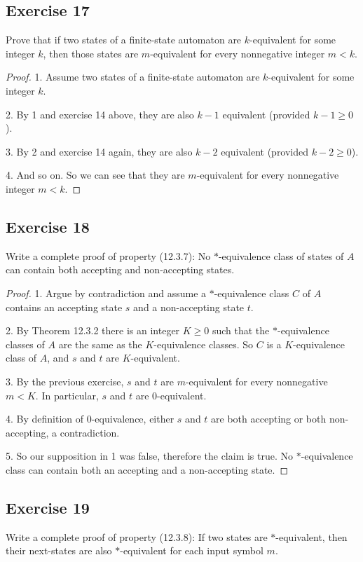 \documentclass[14pt]{extarticle}
\begin{document}
\subsection{Exercise 17}
Prove that if two states of a finite-state automaton are \(k\)-equivalent for some integer \(k\), then those states are
\(m\)-equivalent for every nonnegative integer \(m < k\).

\begin{proof}
    1. Assume two states of a finite-state automaton are \(k\)-equivalent for some integer \(k\).

    2. By 1 and exercise 14 above, they are also \(k-1\) equivalent (provided \(k-1 \geq 0\)).

    3. By 2 and exercise 14 again, they are also \(k-2\) equivalent (provided \(k-2 \geq 0\)).

    4. And so on. So we can see that they are \(m\)-equivalent for every nonnegative integer \(m < k\).
\end{proof}

\subsection{Exercise 18}
Write a complete proof of property (12.3.7): No \(*\)-equivalence class of states of \(A\) can contain both
accepting and non-accepting states.

\begin{proof}
    1. Argue by contradiction and assume a \(*\)-equivalence class \(C\) of \(A\) contains an accepting state \(s\) and a
    non-accepting state \(t\).

    2. By Theorem 12.3.2 there is an integer \(K \geq 0\) such that the \(*\)-equivalence classes of \(A\) are the same as
    the \(K\)-equivalence classes. So \(C\) is a \(K\)-equivalence class of \(A\), and \(s\) and \(t\) are \(K\)-equivalent.

    3. By the previous exercise, \(s\) and \(t\) are \(m\)-equivalent for every nonnegative \(m < K\). In particular,
    \(s\) and \(t\) are 0-equivalent.

    4. By definition of 0-equivalence, either \(s\) and \(t\) are both accepting or both non-accepting, a contradiction.

    5. So our supposition in 1 was false, therefore the claim is true. No \(*\)-equivalence class can contain both an accepting
    and a non-accepting state.
\end{proof}

\subsection{Exercise 19}
Write a complete proof of property (12.3.8): If two states are \(*\)-equivalent, then their next-states are also
\(*\)-equivalent for each input symbol \(m\).
\end{document}
